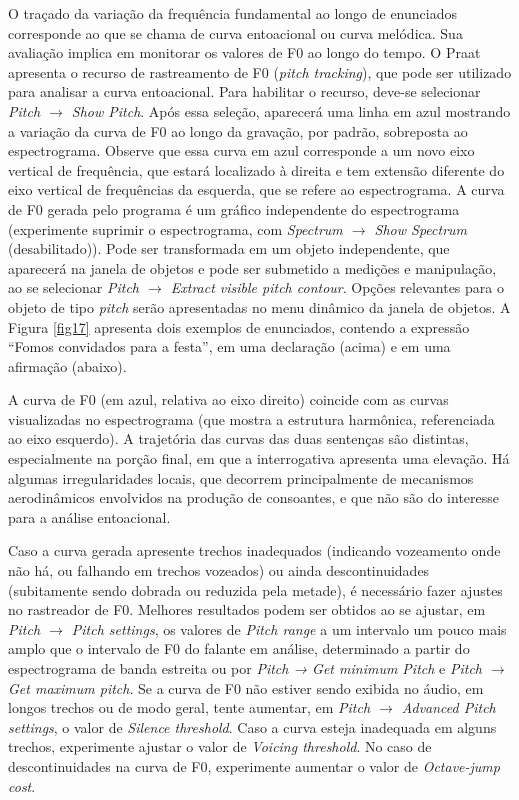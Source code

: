 \documentclass[portuguese]{textolivre}
\begin{document}
O traçado da variação da frequência fundamental ao longo de enunciados corresponde ao que se chama de curva entoacional ou curva melódica. Sua avaliação implica em monitorar os valores de F0 ao longo do tempo. O Praat apresenta o recurso de rastreamento de F0 (\textit{pitch tracking}), que pode ser utilizado para analisar a curva entoacional. Para habilitar o recurso, deve-se selecionar \textit{Pitch $\rightarrow$ Show Pitch}. Após essa seleção, aparecerá uma linha em azul mostrando a variação da curva de F0 ao longo da gravação, por padrão, sobreposta ao espectrograma. Observe que essa curva em azul corresponde a um novo eixo vertical de frequência, que estará localizado à direita e tem extensão diferente do eixo vertical de frequências da esquerda, que se refere ao espectrograma. A curva de F0 gerada pelo programa é um gráfico independente do espectrograma (experimente suprimir o espectrograma, com \textit{Spectrum $\rightarrow$ Show Spectrum} (desabilitado)). Pode ser transformada em um objeto independente, que aparecerá na janela de objetos e pode ser submetido a medições e manipulação, ao se selecionar \textit{Pitch $\rightarrow$ Extract visible pitch contour}. Opções relevantes para o objeto de tipo \textit{pitch} serão apresentadas no menu dinâmico da janela de objetos. A Figura \ref{fig17} apresenta dois exemplos de enunciados, contendo a expressão ``Fomos convidados para a festa'', em uma declaração (acima) e em uma afirmação (abaixo). 

A curva de F0 (em azul, relativa ao eixo direito) coincide com as curvas visualizadas no espectrograma (que mostra a estrutura harmônica, referenciada ao eixo esquerdo). A trajetória das curvas das duas sentenças são distintas, especialmente na porção final, em que a interrogativa apresenta uma elevação. Há algumas irregularidades locais, que decorrem principalmente de mecanismos aerodinâmicos envolvidos na produção de consoantes, e que não são do interesse para a análise entoacional.

Caso a curva gerada apresente trechos inadequados (indicando vozeamento onde não há, ou falhando em trechos vozeados) ou ainda descontinuidades (subitamente sendo dobrada ou reduzida pela metade), é necessário fazer ajustes no rastreador de F0. Melhores resultados podem ser obtidos ao se ajustar, em \textit{Pitch $\rightarrow$ Pitch settings}, os valores de \textit{Pitch range} a um intervalo um pouco mais amplo que o intervalo de F0 do falante em análise, determinado a partir do espectrograma de banda estreita ou por \textit{Pitch → Get minimum Pitch} e \textit{Pitch $\rightarrow$ Get maximum pitch}. Se a curva de F0 não estiver sendo exibida no áudio, em longos trechos ou de modo geral, tente aumentar, em \textit{Pitch $\rightarrow$ Advanced Pitch settings}, o valor de \textit{Silence threshold}. Caso a curva esteja inadequada em alguns trechos, experimente ajustar o valor de \textit{Voicing threshold}. No caso de descontinuidades na curva de F0, experimente aumentar o valor de \textit{Octave-jump cost}.
\end{document}

